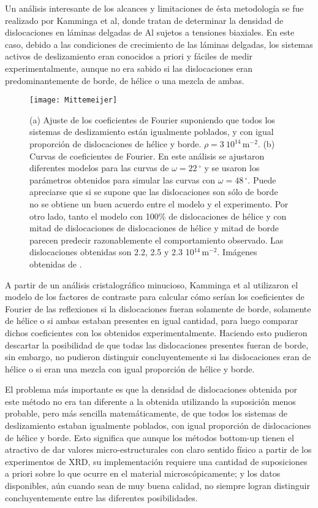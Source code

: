 Un análisis interesante de los alcances y limitaciones de ésta metodología se fue realizado por Kamminga et al\cite{mittemeijer2003diffraction}, donde tratan de determinar la densidad de dislocaciones en láminas delgadas de Al sujetos a tensiones biaxiales.
En este caso, debido a las condiciones de crecimiento de las láminas delgadas, los sistemas activos de deslizamiento eran conocidos a priori y fáciles de medir experimentalmente, aunque no era sabido si las dislocaciones eran predominantemente de borde, de hélice o una mezcla de ambas.

\begin{figure}[!htb]
  \centering
  \texttt{[image: Mittemeijer]}
  \caption{(a) Ajuste de los coeficientes de Fourier suponiendo que todos los sistemas de deslizamiento están igualmente poblados, y con igual proporción de dislocaciones de hélice y borde. $\rho = 3 \ 10^{14}$\,m$^{-2}$. (b) Curvas de coeficientes de Fourier. En este análisis se ajustaron diferentes modelos para las curvas de $\omega = 22\,^{\circ}$ y se usaron los parámetros obtenidos para simular las curvas con $\omega = 48\,^{\circ}$. Puede apreciarse que si se supone que las dislocaciones son sólo de borde no se obtiene un buen acuerdo entre el modelo y el experimento. Por otro lado, tanto el modelo con 100\% de dislocaciones de hélice y con mitad de dislocaciones de dislocaciones de hélice y mitad de borde parecen predecir razonablemente el comportamiento observado. Las dislocaciones obtenidas son 2.2, 2.5 y 2.3 10$^{14}$\,m$^{-2}$. Imágenes obtenidas de \cite{mittemeijer2003diffraction}.}
  \label{fig:FourierMittemeijer}
\end{figure}

A partir de un análisis cristalográfico minucioso, Kamminga et al utilizaron el modelo de los factores de contraste para calcular cómo serían los coeficientes de Fourier de las reflexiones si la dislocaciones fueran solamente de borde, solamente de hélice o si ambas estaban presentes en igual cantidad, para luego comparar dichos coeficientes con los obtenidos experimentalmente.
Haciendo esto pudieron descartar la posibilidad de que todas las dislocaciones presentes fueran de borde, sin embargo, no pudieron distinguir concluyentemente si las dislocaciones eran de hélice o si eran una mezcla con igual proporción de hélice y borde.

El problema más importante es que la densidad de dislocaciones obtenida por este método no era tan diferente a la obtenida utilizando la suposición menos probable, pero más sencilla matemáticamente, de que todos los sistemas de deslizamiento estaban igualmente poblados, con igual proporción de dislocaciones de hélice y borde.
Esto significa que aunque los métodos bottom-up tienen el atractivo de dar valores micro-estructurales con claro sentido físico a partir de los experimentos de XRD, su implementación requiere una cantidad de suposiciones a priori sobre lo que ocurre en el material microscópicamente; y los datos disponibles, aún cuando sean de muy buena calidad, no siempre logran distinguir concluyentemente entre las diferentes posibilidades.


